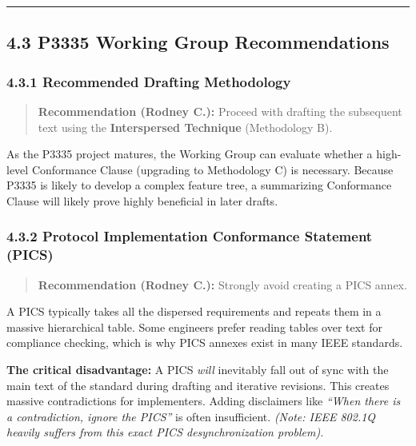 \documentclass[
]{article}
\begin{document}
\begin{center}\rule{0.5\linewidth}{0.5pt}\end{center}

\subsection{4.3 P3335 Working Group
Recommendations}\label{p3335-working-group-recommendations}

\subsubsection{4.3.1 Recommended Drafting
Methodology}\label{recommended-drafting-methodology}

\begin{quote}
\textbf{Recommendation (Rodney C.):} Proceed with drafting the
subsequent text using the \textbf{Interspersed Technique} (Methodology
B).
\end{quote}

As the P3335 project matures, the Working Group can evaluate whether a
high-level Conformance Clause (upgrading to Methodology C) is necessary.
Because P3335 is likely to develop a complex feature tree, a summarizing
Conformance Clause will likely prove highly beneficial in later drafts.

\subsubsection{4.3.2 Protocol Implementation Conformance Statement
(PICS)}\label{protocol-implementation-conformance-statement-pics}

\begin{quote}
\textbf{Recommendation (Rodney C.):} Strongly avoid creating a PICS
annex.
\end{quote}

A PICS typically takes all the dispersed requirements and repeats them
in a massive hierarchical table. Some engineers prefer reading tables
over text for compliance checking, which is why PICS annexes exist in
many IEEE standards.

\textbf{The critical disadvantage:} A PICS \emph{will} inevitably fall
out of sync with the main text of the standard during drafting and
iterative revisions. This creates massive contradictions for
implementers. Adding disclaimers like \emph{``When there is a
contradiction, ignore the PICS''} is often insufficient. \emph{(Note:
IEEE 802.1Q heavily suffers from this exact PICS desynchronization
problem).}
\end{document}
